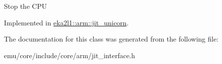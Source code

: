 Stop the C\+PU 

Implemented in \mbox{\hyperlink{classeka2l1_1_1arm_1_1jit__unicorn_ab3ca860b367d833950226b0d7f95edc5}{eka2l1\+::arm\+::jit\+\_\+unicorn}}.



The documentation for this class was generated from the following file\+:\begin{DoxyCompactItemize}
\item 
emu/core/include/core/arm/jit\+\_\+interface.\+h\end{DoxyCompactItemize}
